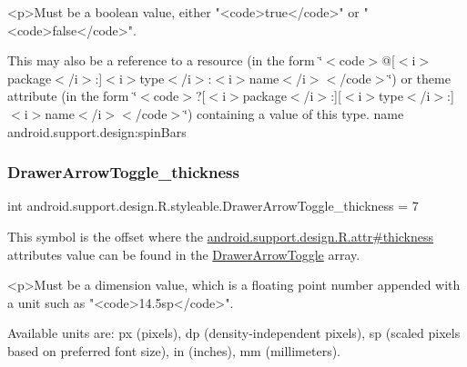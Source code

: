 \begin{DoxyVerb}      <p>Must be a boolean value, either "<code>true</code>" or "<code>false</code>".
\end{DoxyVerb}
 

This may also be a reference to a resource (in the form \char`\"{}$<$code$>$@\mbox{[}$<$i$>$package$<$/i$>$\+:\mbox{]}$<$i$>$type$<$/i$>$\+:$<$i$>$name$<$/i$>$$<$/code$>$\char`\"{}) or theme attribute (in the form \char`\"{}$<$code$>$?\mbox{[}$<$i$>$package$<$/i$>$\+:\mbox{]}\mbox{[}$<$i$>$type$<$/i$>$\+:\mbox{]}$<$i$>$name$<$/i$>$$<$/code$>$\char`\"{}) containing a value of this type.  name android.\+support.\+design\+:spin\+Bars \mbox{\label{classandroid_1_1support_1_1design_1_1R_1_1styleable_af90c46759c926f94b975e2379b862526}} 
\subsubsection{\texorpdfstring{Drawer\+Arrow\+Toggle\+\_\+thickness}{DrawerArrowToggle\_thickness}}
{\footnotesize\ttfamily int android.\+support.\+design.\+R.\+styleable.\+Drawer\+Arrow\+Toggle\+\_\+thickness = 7\hspace{0.3cm}{\ttfamily [static]}}

This symbol is the offset where the \hyperlink{classandroid_1_1support_1_1design_1_1R_1_1attr_a7e47d9a993eb1d4446c21d067f23ea40}{android.\+support.\+design.\+R.\+attr\#thickness} attribute\textquotesingle{}s value can be found in the \hyperlink{classandroid_1_1support_1_1design_1_1R_1_1styleable_a559d22c78738e5161420dc4b41689c1b}{Drawer\+Arrow\+Toggle} array.

\begin{DoxyVerb}      <p>Must be a dimension value, which is a floating point number appended with a unit such as "<code>14.5sp</code>".
\end{DoxyVerb}
 Available units are\+: px (pixels), dp (density-\/independent pixels), sp (scaled pixels based on preferred font size), in (inches), mm (millimeters). 

